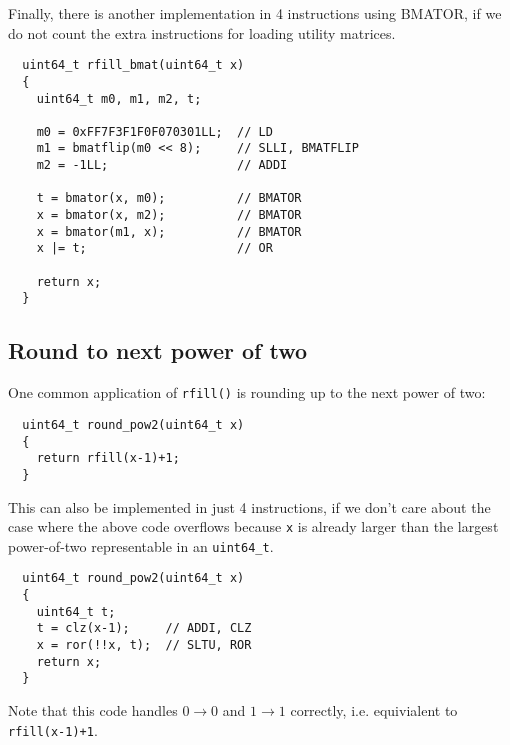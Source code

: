 Finally, there is another implementation in 4 instructions using BMATOR, if we do
not count the extra instructions for loading utility matrices.

\begin{minipage}{\linewidth}
\begin{verbatim}
  uint64_t rfill_bmat(uint64_t x)
  {
    uint64_t m0, m1, m2, t;

    m0 = 0xFF7F3F1F0F070301LL;  // LD
    m1 = bmatflip(m0 << 8);     // SLLI, BMATFLIP
    m2 = -1LL;                  // ADDI

    t = bmator(x, m0);          // BMATOR
    x = bmator(x, m2);          // BMATOR
    x = bmator(m1, x);          // BMATOR
    x |= t;                     // OR

    return x;
  }
\end{verbatim}
\end{minipage}


\subsection{Round to next power of two}

One common application of {\tt rfill()} is rounding up to the next power of two:

\begin{minipage}{\linewidth}
\begin{verbatim}
  uint64_t round_pow2(uint64_t x)
  {
    return rfill(x-1)+1;
  }
\end{verbatim}
\end{minipage}

This can also be implemented in just 4 instructions, if we don't care about the
case where the above code overflows because {\tt x} is already larger than the
largest power-of-two representable in an {\tt uint64\_t}.

\begin{minipage}{\linewidth}
\begin{verbatim}
  uint64_t round_pow2(uint64_t x)
  {
    uint64_t t;
    t = clz(x-1);     // ADDI, CLZ
    x = ror(!!x, t);  // SLTU, ROR
    return x;
  }
\end{verbatim}
\end{minipage}

Note that this code handles $0\rightarrow{}0$ and $1\rightarrow{}1$ correctly,
i.e. equivialent to {\tt rfill(x-1)+1}.

